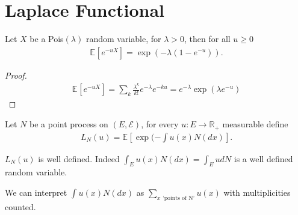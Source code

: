 \section{Laplace Functional}
\begin{lemma}[]
Let $X$ be a Pois$(\lambda )$ random variable, for $\lambda > 0$, then for all $u\geq 0$ 
\begin{align}
\mathbb{E}_{} \left[ e^{-u X} \right] = \exp( - \lambda (1 - e^{-u})).
\end{align}
\end{lemma}
\begin{proof}
	\begin{align}
		\mathbb{E}_{} \left[ e^{-u X} \right] = \sum_{k}^{} \frac{\lambda^{k}}{k!}e^{-\lambda }e^{-ku} = e^{-\lambda }\exp(\lambda e^{-u})
	\end{align}
\end{proof}

\begin{defn}
	Let $N$ be a point process on $(E, \mathcal{E})$, for every $u:E\to \mathbb{R}_+$ measurable define 
	\begin{align}
		\boxed{		L_N(u) = \mathbb{E}_{} \left[ \exp(- \int u(x) N(dx) \right]. }
	\end{align}
\end{defn}

\begin{rmk}[]
	$L_N(u)$ is well defined. Indeed $\int_E u(x) N(dx) = \int_E u dN$ is a well defined random variable.
\end{rmk}

We can interpret $\int_{}^{} u(x)N(dx)$ as $\sum_{x \textrm{ 'points of N'}}^{} u(x)$ with multiplicities counted.

